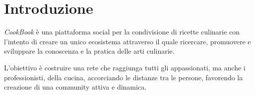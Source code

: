 \chapter*{Introduzione}

\textit{CookBook} è una piattaforma social per la condivisione di ricette culinarie
con l'intento di creare un unico ecosistema attraverso il quale ricercare, 
promuovere e sviluppare la conoscenza e la pratica delle arti culinarie.

L'obiettivo è costruire una rete che raggiunga tutti gli appassionati, ma anche i 
professionisti, della cucina, accorciando le distanze tra le persone, favorendo la 
creazione di una community attiva e dinamica.
